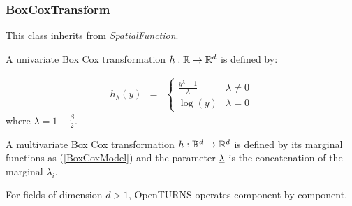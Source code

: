 \newpage
\subsubsection{BoxCoxTransform}

This class inherits from \textit{SpatialFunction}.

A univariate Box Cox transformation $h: {\mathbb R} \rightarrow {\mathbb R}^d$  is defined by:

\begin{eqnarray}
\label{BoxCoxModel}
h_\lambda(y) & = &
\left\{
\begin{array}{ll}
\frac{y^\lambda-1}{\lambda} & \lambda \neq 0 \\
\log(y)                      & \lambda = 0
\end{array}
\right.
\end{eqnarray}
where $\lambda = 1-\frac{\beta}{2}$.

A multivariate Box Cox transformation $h: {\mathbb R}^d \rightarrow {\mathbb R}^d$  is defined by its marginal functions as (\ref{BoxCoxModel}) and the parameter ${\underline{\lambda}}$ is the concatenation of the marginal $\lambda_i$.


For fields of dimension $d>1$, OpenTURNS operates component by component.

